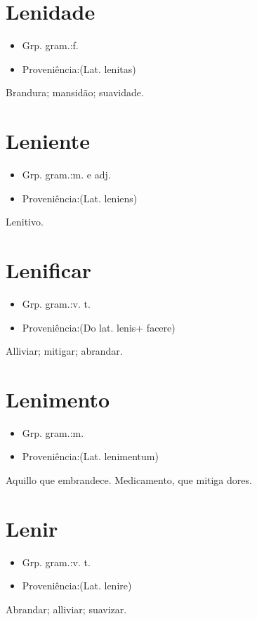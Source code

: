\section{Lenidade}
\begin{itemize}
\item {Grp. gram.:f.}
\end{itemize}
\begin{itemize}
\item {Proveniência:(Lat. \textunderscore lenitas\textunderscore )}
\end{itemize}
Brandura; mansidão; suavidade.
\section{Leniente}
\begin{itemize}
\item {Grp. gram.:m.  e  adj.}
\end{itemize}
\begin{itemize}
\item {Proveniência:(Lat. \textunderscore leniens\textunderscore )}
\end{itemize}
Lenitivo.
\section{Lenificar}
\begin{itemize}
\item {Grp. gram.:v. t.}
\end{itemize}
\begin{itemize}
\item {Proveniência:(Do lat. \textunderscore lenis\textunderscore  + \textunderscore facere\textunderscore )}
\end{itemize}
Alliviar; mitigar; abrandar.
\section{Lenimento}
\begin{itemize}
\item {Grp. gram.:m.}
\end{itemize}
\begin{itemize}
\item {Proveniência:(Lat. \textunderscore lenimentum\textunderscore )}
\end{itemize}
Aquillo que embrandece.
Medicamento, que mitiga dores.
\section{Lenir}
\begin{itemize}
\item {Grp. gram.:v. t.}
\end{itemize}
\begin{itemize}
\item {Proveniência:(Lat. \textunderscore lenire\textunderscore )}
\end{itemize}
Abrandar; alliviar; suavizar.
